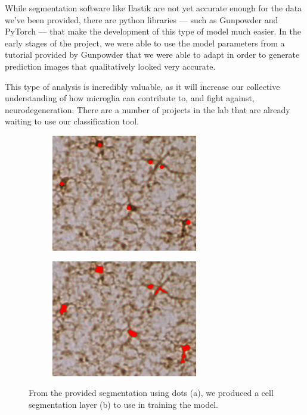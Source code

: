 \documentclass{article}
\begin{document}
While segmentation software like Ilastik are not yet accurate enough for the 
data we've been provided, there are python libraries --- such as 
Gunpowder \parencite{gunpowder} and PyTorch \parencite{pytorch} --- that make 
the development of this type of model much easier. In the early stages of the 
project, we were able to use the model parameters from a tutorial provided by 
Gunpowder \parencite{gunpowder-tutorial} that we were able to adapt in order 
to generate prediction images that qualitatively looked very accurate.

This type of analysis is incredibly valuable, as it will increase our 
collective understanding of how microglia can contribute to, and fight against,
neurodegeneration. There are a number of projects in the lab that are already 
waiting to use our classification tool.

\begin{figure}[ht]
  \begin{subfigure}{0.49\textwidth}
    \includegraphics[width=0.7\textwidth]{classification2-dots.png}
    \centering
    \caption{}
    \label{fig:classification2-dots}
  \end{subfigure}
  \begin{subfigure}{0.49\textwidth}
    \includegraphics[width=0.7\textwidth]{classification2-cell.png}
    \centering
    \caption{}
    \label{fig:classification2-cell}
  \end{subfigure}
  \captionsetup{width=0.85\textwidth}
  \caption{From the provided segmentation using dots (a), we produced a cell
  segmentation layer (b) to use in training the model.}
\end{figure}
\end{document}
